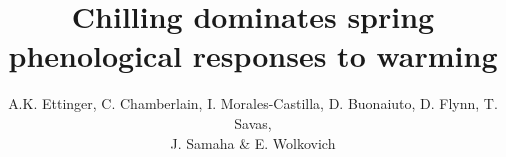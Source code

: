 \documentclass{article}
\begin{document}
% 

\title{Chilling dominates spring phenological responses to warming} 

\author{A.K. Ettinger, C. Chamberlain, I. Morales-Castilla, D. Buonaiuto, D. Flynn, T. Savas, \\J. Samaha \& E. Wolkovich}
\maketitle %



\end{document}
